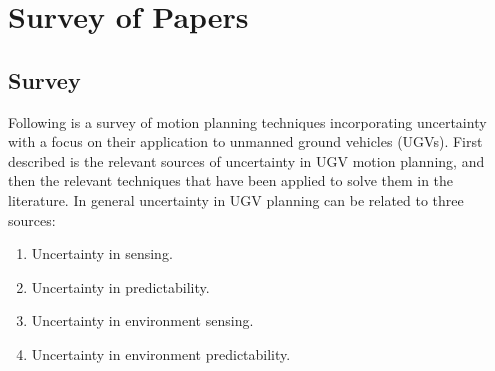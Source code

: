\chapter{Survey of Papers}




\section{Survey}

Following is a survey of motion planning techniques incorporating uncertainty
with a focus on their application to unmanned ground vehicles (UGVs). First
described is the relevant sources of uncertainty in UGV motion planning, and
then the relevant techniques that have been applied to solve them in the
literature. In general uncertainty in UGV planning can be related to three
sources:
\begin{enumerate}
\item Uncertainty in  sensing.
\item Uncertainty in predictability.
\item Uncertainty in environment sensing.
\item Uncertainty in environment predictability.
\end{enumerate}~\cite{lavalleFrameworkMotionPlanning1995}

